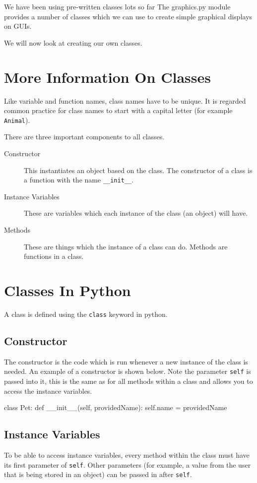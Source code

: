 
We have been using pre-written classes lots so far The graphics.py module provides a number of classes which we can use to create simple graphical displays on GUIs. 

We will now look at creating our own classes. 

\section*{More Information On Classes}
Like variable and function names, class names have to be unique. It is regarded common practice for class names to start with a capital letter (for example \texttt{Animal}). 

There are three important components to all classes.
\begin{description}
    \item[Constructor] This instantiates an object based on the class. The constructor of a class is a function with the name \texttt{\_\_init\_\_}. 
    \item[Instance Variables] These are variables which each instance of the class (an object) will have.
    \item[Methods] These are things which the instance of a class can do. Methods are functions in a class. 
\end{description}

\section*{Classes In Python}
A class is defined using the \texttt{class} keyword in python. 

\subsection*{Constructor}
The constructor is the code which is run whenever a new instance of the class is needed. An example of a constructor is shown below. Note the parameter \texttt{self} is passed into it, this is the same as for all methods within a class and allows you to access the instance variables.
\begin{python}
class Pet:
    def __init__(self, providedName):
        self.name = providedName
\end{python}

\subsection*{Instance Variables}
To be able to access instance variables, every method within the class must have its first parameter of \texttt{self}. Other parameters (for example, a value from the user that is being stored in an object) can be passed in after \texttt{self}.

